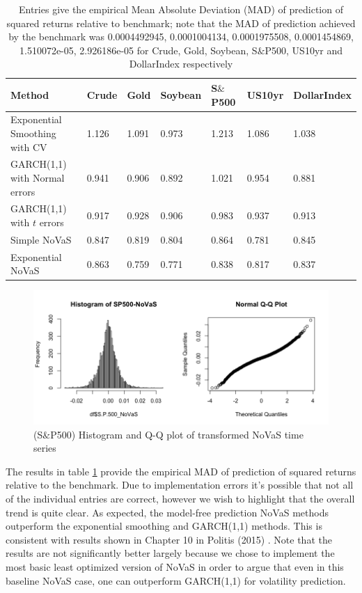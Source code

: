 \documentclass[11pt,]{article}
\begin{document}
\begin{table}[ht]

\begin{tabular}{ |p{6cm}||p{1cm}|p{1cm}|p{1.4cm}|p{1.3cm}|p{1.2cm}|p{2cm}|}
 \hline
 Method & Crude & Gold & Soybean & S$\&$P500 & US10yr & DollarIndex\\
 \hline
 Exponential Smoothing with CV   & 1.126  & 1.091 & 0.973 & 1.213 & 1.086 & 1.038\\
 GARCH(1,1) with Normal errors  & 0.941 & 0.906 & 0.892 & 1.021 & 0.954 & 0.881\\
 GARCH(1,1) with $t$ errors  & 0.917  & 0.928 & 0.906 & 0.983 & 0.937 & 0.913\\
 Simple NoVaS  & 0.847  & 0.819 & 0.804 & 0.864 & 0.781 & 0.845\\
 Exponential NoVaS  & 0.863  & 0.759 & 0.771 & 0.838 & 0.817 & 0.837\\
 \hline
\end{tabular}
\caption{\label{results} Entries give the empirical Mean Absolute Deviation (MAD) of prediction of squared returns relative to benchmark; note that the MAD of prediction achieved by the benchmark was 0.0004492945, 0.0001004134, 0.0001975508, 0.0001454869, 1.510072e-05, 2.926186e-05 for Crude, Gold, Soybean, S$\&$P500, US10yr and DollarIndex respectively}
\end{table}

\begin{figure}[ht]
\includegraphics[width=1.0\textwidth]{sp500_novas.png}
\caption{\label{sp500_novas} (S$\&$P500) Histogram and Q-Q plot of transformed NoVaS time series}
\end{figure}

The results in table \ref{results} provide the empirical MAD of prediction of squared returns relative to the benchmark. Due to implementation errors it's possible that not all of the individual entries are correct, however we wish to highlight that the overall trend is quite clear. As expected, the model-free prediction NoVaS methods outperform the exponential smoothing and GARCH(1,1) methods. This is consistent with results shown in Chapter 10 in Politis (2015) \cite{Politis2015}. Note that the results are not significantly better largely because we chose to implement the most basic least optimized version of NoVaS in order to argue that even in this baseline NoVaS case, one can outperform GARCH(1,1) for volatility prediction.
\end{document}
